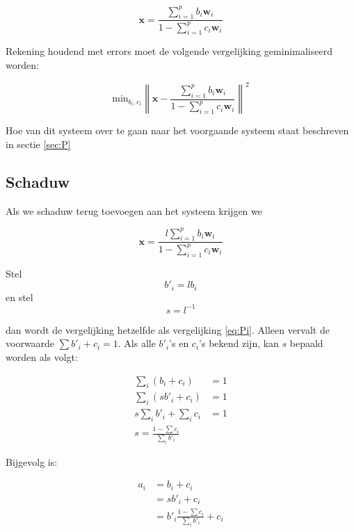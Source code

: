 \documentclass[12pt]{report}
\begin{document}
\begin{equation} \label{eq:Pi}
\bm{x} = \frac{\sum_{i=1}^p b_{i} \bm{w}_{i}}{1-\sum_{i=1}^p c_{i} \bm{w}_{i}}
\end{equation}

Rekening houdend met errors moet de volgende vergelijking geminimaliseerd worden:

\begin{equation}
\text{min}_{b_i,c_i} \left\lVert \bm{x} - \frac{\sum_{i=1}^p b_{i} \bm{w}_{i}}{1-\sum_{i=1}^p c_{i} \bm{w}_{i}} \right\rVert^2 \label{eq:mlm}
\end{equation}

Hoe van dit systeem over te gaan naar het voorgaande systeem staat beschreven in sectie \ref{sec:P}

\subsection{Schaduw}

Als we schaduw terug toevoegen aan het systeem krijgen we

\begin{equation} \label{eq:Pi}
\bm{x} = \frac{l\sum_{i=1}^p b_{i} \bm{w}_{i}}{1-\sum_{i=1}^p c_{i} \bm{w}_{i}}
\end{equation}

Stel
\begin{equation}
b'_i = lb_i
\end{equation}
en stel
\begin{equation}
s = l^{-1}
\end{equation}



dan wordt de vergelijking hetzelfde als vergelijking \ref{eq:Pi}. Alleen vervalt de voorwaarde $\sum b'_i + c_i = 1$. Als alle $b'_i$'s en $c_i$'s bekend zijn, kan $s$ bepaald worden als volgt:

\begin{align}
\sum_i \left(b_i + c_i\right) &= 1 \\
\sum_i \left(sb'_i + c_i\right) &= 1 \\
s\sum_i b'_i + \sum_i c_i &= 1 \\
s = \frac{1-\sum c_i}{\sum_i b'_i} 
\end{align}

Bijgevolg is:

\begin{align}
a_i &= b_i + c_i \\
&= sb'_i + c_i \\
&= b'_i \frac{1-\sum c_i}{\sum_i b'_i} +c_i \\
\end{align}
\end{document}
